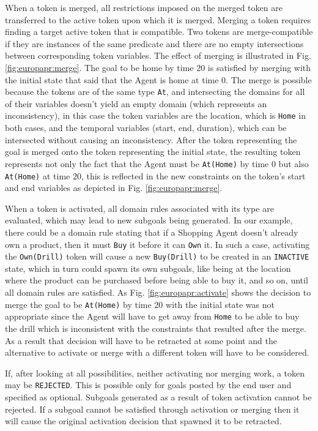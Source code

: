 \begin{description}
\begin{enumerate}
\end{enumerate}

When a token is merged, all restrictions imposed on the merged token
are transferred to the active token upon which it is merged. Merging a
token requires finding a target active token that is compatible. Two
tokens are merge-compatible if they are instances of the same
predicate and there are no empty intersections between corresponding
token variables.  The effect of merging is illustrated in
Fig. \ref{fig:europapr:merge}. The goal to be home by time $20$ is
satisfied by merging with the initial state that said that the Agent
is home at time $0$.  The merge is possible because the tokens are of
the same type \texttt{At}, and intersecting the domains for all of
their variables doesn't yield an empty domain (which represents an
inconsistency), in this case the token variables are the location,
which is \texttt{Home} in both cases, and the temporal variables
(start, end, duration), which can be intersected without causing an
inconsistency. After the token representing the goal is merged onto
the token representing the initial state, the resulting token
represents not only the fact that the Agent must be \texttt{At(Home)}
by time 0 but also \texttt{At(Home)} at time $20$, this is reflected
in the new constraints on the token's start and end variables as
depicted in Fig. \ref{fig:europapr:merge}.

When a token is activated, all domain rules associated with its type
are evaluated, which may lead to new subgoals being generated. In our
example, there could be a domain rule stating that if a Shopping Agent
doesn't already own a product, then it must \texttt{Buy} it before it
can \texttt{Own} it. In such a case, activating the
\texttt{Own(Drill)} token will cause a new \texttt{Buy(Drill)} to be
created in an \texttt{INACTIVE} state, which in turn could spawn its
own subgoals, like being at the location where the product can be
purchased before being able to buy it, and so on, until all domain
rules are satisfied. As Fig. \ref{fig:europapr:activate} shows the
decision to merge the goal to be \texttt{At(Home)} by time $20$ with
the initial state was not appropriate since the Agent will have to get
away from \texttt{Home} to be able to buy the drill which is
inconsistent with the constraints that resulted after the merge. As a
result that decision will have to be retracted at some point and the
alternative to activate or merge with a different token will have to
be considered.

If, after looking at all possibilities, neither activating nor merging
work, a token may be \texttt{REJECTED}. This is possible only for
goals posted by the end user and specified as optional. Subgoals
generated as a result of token activation cannot be rejected. If a
subgoal cannot be satisfied through activation or merging then it will
cause the original activation decision that spawned it to be
retracted.


\end{description}
